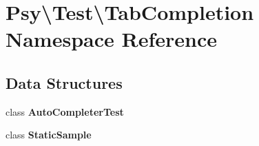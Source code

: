 \section{Psy\textbackslash{}Test\textbackslash{}Tab\+Completion Namespace Reference}
\label{namespace_psy_1_1_test_1_1_tab_completion}
\subsection*{Data Structures}
\begin{DoxyCompactItemize}
\item 
class {\bf Auto\+Completer\+Test}
\item 
class {\bf Static\+Sample}
\end{DoxyCompactItemize}
